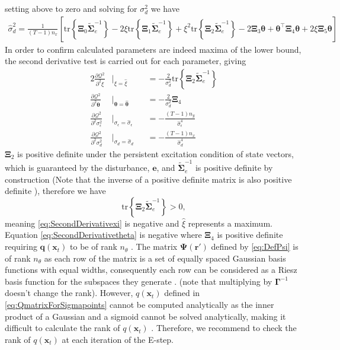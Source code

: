 \documentclass[]{article}
\begin{document}
setting above to zero and solving for $\sigma_d^2$ we have
\begin{align}
\hat{\sigma}_d^2=\frac{1}{(T-1)n_x}\left[ \mathrm{tr}\left\lbrace \boldsymbol\Xi_0 \tilde{\boldsymbol\Sigma}_e^{-1}\right\rbrace-
2\xi\mathrm{tr}\left\lbrace \boldsymbol\Xi_1 \tilde{\boldsymbol\Sigma}_e^{-1}\right\rbrace +\xi^2\mathrm{tr} \left\lbrace\boldsymbol\Xi_2\tilde{\boldsymbol\Sigma}_e^{-1}\right\rbrace -2\boldsymbol\Xi_3\boldsymbol\theta+\boldsymbol\theta^\top\boldsymbol \Xi_4\boldsymbol\theta+2\xi\boldsymbol\Xi_5 \boldsymbol\theta\right]  
\end{align}
In order to confirm calculated parameters are indeed maxima of the lower bound, the second derivative test is carried out for each parameter, giving
\begin{alignat}{2}%
 \frac{\partial \mathcal Q^2}{\partial^2\xi}&\biggr\rvert_{\xi=\hat{\xi}}&&=-\frac{2}{\sigma_d^2}\mathrm{tr}\left\lbrace \boldsymbol\Xi_2 \tilde{\boldsymbol\Sigma}_e^{-1}\right\rbrace \label{eq:SecondDerivativexi}\\
 \frac{\partial \mathcal Q^2}{\partial^2\boldsymbol\theta}&\biggr\rvert_{\boldsymbol\theta=\hat{\boldsymbol\theta}}&&=-\frac{2}{\sigma_d^2}\boldsymbol\Xi_4 \label{eq:SecondDerivativetheta} \\
 \frac{\partial \mathcal Q^2}{\partial^2\sigma_{\epsilon}^2}&\biggr\rvert_{\sigma_{\epsilon}=\hat{\sigma}_{\epsilon}}&&=-\frac{(T-1)n_y}{\hat{\sigma}_{\epsilon}^4} \label{eq:SecondDerivativenoise} \\
 \frac{\partial \mathcal Q^2}{\partial^2\sigma_{d}^2}&\biggr\rvert_{{\sigma}_{d}=\hat{\sigma}_{d}}&&= -\frac{(T-1)n_x}{\hat{\sigma}_{d}^4} \label{eq:SecondDerivativedisturbance}
\end{alignat}
$\boldsymbol\Xi_2$ is positive definite under the persistent excitation condition of state vectors, which is guaranteed by the disturbance, $\mathbf e$, and $\tilde{\boldsymbol\Sigma}_e^{-1}$ is positive definite by construction (Note that the inverse of a positive definite matrix is also positive definite \cite{Horn2005}), therefore we have \cite{Coope1994}
\begin{equation}
 \mathrm{tr}\left\lbrace \boldsymbol\Xi_2 \tilde{\boldsymbol\Sigma}_e^{-1}\right\rbrace >0,
\end{equation}
meaning \eqref{eq:SecondDerivativexi} is negative and $\hat{\xi}$ represents a maximum. Equation \eqref{eq:SecondDerivativetheta} is negative where $\boldsymbol\Xi_4$ is positive definite requiring $\mathbf q(\mathbf x_t)$ to be of  rank $n_{\theta}$ \cite{Golub1996}. The matrix $\boldsymbol\Psi(\mathbf r')$ defined by \eqref{eq:DefPsi} is of rank $n_{\theta}$ as each row of the matrix is a set of equally spaced Gaussian basis functions with equal widths, consequently each row can be considered as a Riesz basis function for the subspaces they generate \cite{Ferrari2004}. (note that multiplying by $\mathbf \Gamma^{-1}$ doesn't change the rank). However, $q(\mathbf x_t)$ defined in \eqref{eq:QmatrixForSigmapoints} cannot be computed analytically as the inner product of a Gaussian and a sigmoid cannot be solved analytically, making it difficult to calculate the rank of $q(\mathbf x_t)$ . Therefore, we recommend to check the rank of $q(\mathbf x_t)$ at each iteration of the E-step.
\end{document}
